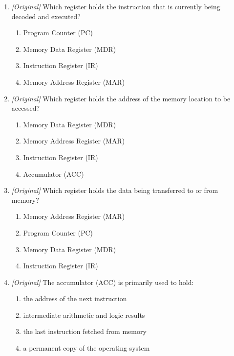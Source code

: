 \begin{enumerate}[label=\textbf{Q\arabic*.}, leftmargin=*]
\begin{enumerate}[label=\Alph*.]
    \item Instruction Register (IR)
    \item Program Counter (PC)
    \item Memory Data Register (MDR)
    \item Accumulator (ACC)
  \end{enumerate}
\item \textit{[Original]} Which register holds the instruction that is
  currently being decoded and executed?
  \begin{enumerate}[label=\Alph*.]
    \item Program Counter (PC)
    \item Memory Data Register (MDR)
    \item Instruction Register (IR)
    \item Memory Address Register (MAR)
  \end{enumerate}
\item \textit{[Original]} Which register holds the address of the memory
  location to be accessed?
  \begin{enumerate}[label=\Alph*.]
    \item Memory Data Register (MDR)
    \item Memory Address Register (MAR)
    \item Instruction Register (IR)
    \item Accumulator (ACC)
  \end{enumerate}
\item \textit{[Original]} Which register holds the data being transferred to
  or from memory?
  \begin{enumerate}[label=\Alph*.]
    \item Memory Address Register (MAR)
    \item Program Counter (PC)
    \item Memory Data Register (MDR)
    \item Instruction Register (IR)
  \end{enumerate}
\item \textit{[Original]} The accumulator (ACC) is primarily used to hold:
  \begin{enumerate}[label=\Alph*.]
    \item the address of the next instruction
    \item intermediate arithmetic and logic results
    \item the last instruction fetched from memory
    \item a permanent copy of the operating system

\end{enumerate}
\end{enumerate}
